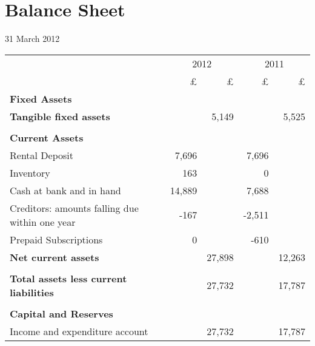 \section{Balance Sheet}
31 March 2012

\begin{center}
\begin{tabular}{  l  r  r r r}
\toprule
                            & \multicolumn{2}{c}{2012} &  \multicolumn{2}{c}{2011} \\
\cmidrule(r){2-3} \cmidrule(r){4-5}
                                               & £        & £       & £      & £      \\
{\bf Fixed Assets}                             &          &         &        &        \\
{\bf Tangible fixed assets}                    &          & 5,149   &        & 5,525  \\
\cmidrule(r){2-3} \cmidrule(r){4-5} \\
{\bf Current Assets}                           &          &         &        &        \\
Rental Deposit                                 & 7,696    &         & 7,696  &        \\
Inventory                                      & 163      &         & 0      &        \\
Cash at bank and in hand                       & 14,889   &         & 7,688  &        \\
Creditors: amounts falling due within one year & -167     &         & -2,511 &       \\
Prepaid Subscriptions                          & 0        &         & -610   &       \\
{\bf Net current assets}                       &          & 27,898  &        & 12,263 \\
\cmidrule(r){2-3} \cmidrule(r){4-5} \\
{\bf Total assets less current liabilities}    &          & 27,732  &        & 17,787 \\
\cmidrule(r){2-3} \cmidrule(r){4-5}  \\
{\bf Capital and Reserves}&\\
Income and expenditure account                 &          & 27,732  &        & 17,787 \\
\bottomrule
\end{tabular}

\end{center}

